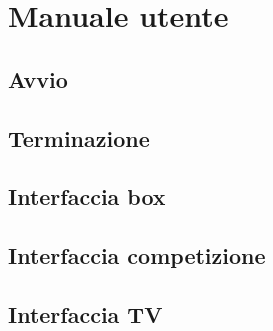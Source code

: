 \section{Manuale utente}
\subsection{Avvio}
\subsection{Terminazione}
\subsection{Interfaccia box}
\subsection{Interfaccia competizione}
\subsection{Interfaccia TV}